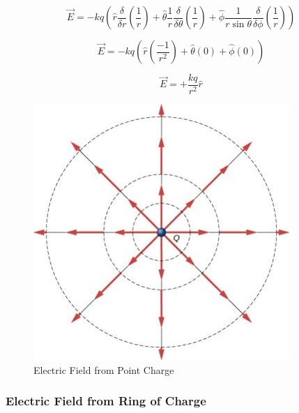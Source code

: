 \documentclass[14pt]{memoir}
\begin{document}
\begin{equation}
\vec{E} = - kq (\hat{r} \frac{\delta}{\delta r} (\frac{1}{r}) + \hat{\theta} \frac{1}{r}\frac{\delta}{\delta \theta} (\frac{1}{r}) + \hat{\phi} \frac{1}{r\sin{\theta}}\frac{\delta}{\delta \phi}(\frac{1}{r}))
\end{equation}

\begin{equation}
\vec{E} = - kq (\hat{r}  (\frac{-1}{r^2}) + \hat{\theta} (0) + \hat{\phi} (0))
\end{equation}

\begin{equation}
\vec{E} = + \frac{kq}{r^2} \hat{r}  
\end{equation}

\begin{figure}[H]
\begin{center}
\includegraphics[scale=0.40]{fig/fig_07_28.jpg}
\caption{Electric Field from Point Charge}
\label{fig:07_28}
\end{center}
\end{figure}

\subsubsection{Electric Field from Ring of Charge}
\end{document}
